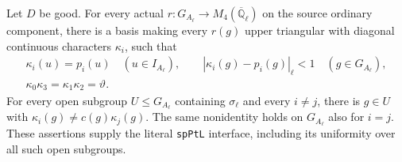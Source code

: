 \begin{proposition}
\label{prop:ax-ordinary}
Let $D$ be good.  For every actual
$r:G_{A_\ell}\to M_4(\overline{\mathbb Q}_\ell)$ on the source
ordinary component, there is a basis making every $r(g)$ upper
triangular with diagonal continuous characters $\kappa_i$, such
that
\[
\begin{gathered}
 \kappa_i(u)=p_i(u)\quad(u\in I_{A_\ell}),\qquad
 |\kappa_i(g)-p_i(g)|_\ell<1\quad(g\in G_{A_\ell}),\\
 \kappa_0\kappa_3=\kappa_1\kappa_2=\vartheta.
\end{gathered}\tag{AX.26}
\]
For every open subgroup $U\le G_{A_\ell}$ containing
$\sigma_\ell$ and every $i\ne j$, there is $g\in U$ with
$\kappa_i(g)\ne c(g)\kappa_j(g)$.  The same nonidentity holds
on $G_{A_\ell}$ also for $i=j$.  These assertions supply the
literal \texttt{spPtL} interface, including its uniformity over
all such open subgroups.
\end{proposition}

